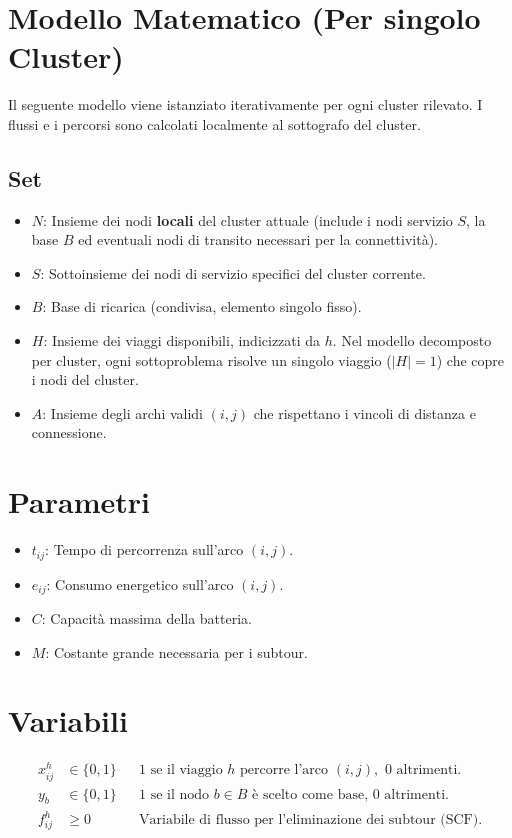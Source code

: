 \documentclass{article}
\begin{document}
\section{Modello Matematico (Per singolo Cluster)}
Il seguente modello viene istanziato iterativamente per ogni cluster rilevato. I flussi e i percorsi sono calcolati localmente al sottografo del cluster.

\subsection{Set}
\begin{itemize}
    \item $N$: Insieme dei nodi \textbf{locali} del cluster attuale (include i nodi servizio $S$, la base $B$ ed eventuali nodi di transito necessari per la connettività).
    \item $S$: Sottoinsieme dei nodi di servizio specifici del cluster corrente.
    \item $B$: Base di ricarica (condivisa, elemento singolo fisso).
    \item $H$: Insieme dei viaggi disponibili, indicizzati da $h$. 
    Nel modello decomposto per cluster, ogni sottoproblema risolve un singolo viaggio ($|H|=1$) che copre i nodi del cluster.
    \item $A$: Insieme degli archi validi $(i,j)$ che rispettano i vincoli di distanza e connessione.
\end{itemize}
\section{Parametri}
\begin{itemize}
    \item $t_{ij}$: Tempo di percorrenza sull'arco $(i,j)$.
    \item $e_{ij}$: Consumo energetico sull'arco $(i,j)$.
    \item $C$: Capacità massima della batteria.
    \item $M$: Costante grande necessaria per i subtour.
\end{itemize}
\section{Variabili}
\begin{align*}
    x_{ij}^h & \in \{0, 1\} && \text{1 se il viaggio } h \text{ percorre l'arco } (i,j), \text{ 0 altrimenti.}\\
    y_b & \in \{0, 1\} && \text{1 se il nodo } b \in B \text{ è scelto come base, 0 altrimenti.} \\
    f_{ij}^h & \ge 0 && \text{Variabile di flusso per l'eliminazione dei subtour (SCF).}
\end{align*}
\end{document}
